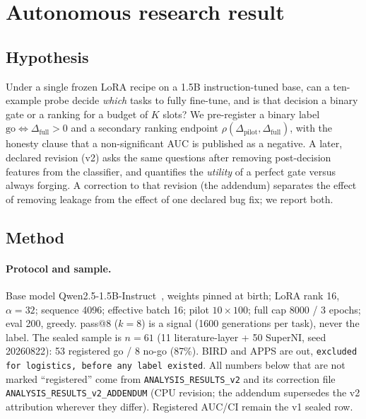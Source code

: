 \section{Autonomous research result}
\label{sec:part1}

\subsection{Hypothesis}
\label{sec:hypothesis}
Under a single frozen LoRA recipe on a 1.5B instruction-tuned base,
can a ten-example probe decide \emph{which} tasks to fully
fine-tune, and is that decision a binary gate or a ranking for a
budget of $K$ slots?
We pre-register a binary label
$\mathrm{go}\Leftrightarrow\Delta_{\mathrm{full}}>0$ and a
secondary ranking endpoint $\rho(\Delta_{\mathrm{pilot}},
\Delta_{\mathrm{full}})$, with the honesty clause that a
non-significant AUC is published as a negative.
A later, declared revision (v2) asks the same questions after
removing post-decision features from the classifier, and quantifies
the \emph{utility} of a perfect gate versus always forging. A
correction to that revision (the addendum) separates the effect of
removing leakage from the effect of one declared bug fix; we
report both.

\subsection{Method}
\label{sec:method}
\paragraph{Protocol and sample.}
Base model Qwen2.5-1.5B-Instruct~\citep{qwen25}, weights pinned at
birth; LoRA rank 16, $\alpha=32$; sequence 4096; effective batch 16;
pilot $10{\times}100$; full cap 8000 / 3 epochs; eval 200, greedy.
pass@8 ($k{=}8$) is a signal (1600 generations per task), never the
label.
The sealed sample is $n{=}61$ (11 literature-layer + 50 SuperNI,
seed 20260822): 53 registered go / 8 no-go (87\%).
BIRD and APPS are out,
\texttt{excluded for logistics, before any label existed}.
All numbers below that are not marked ``registered'' come from
\texttt{ANALYSIS\_RESULTS\_v2} and its correction file
\texttt{ANALYSIS\_RESULTS\_v2\_ADDENDUM} (CPU revision; the
addendum supersedes the v2 attribution wherever they differ).
Registered AUC/CI remain the v1 sealed row.

